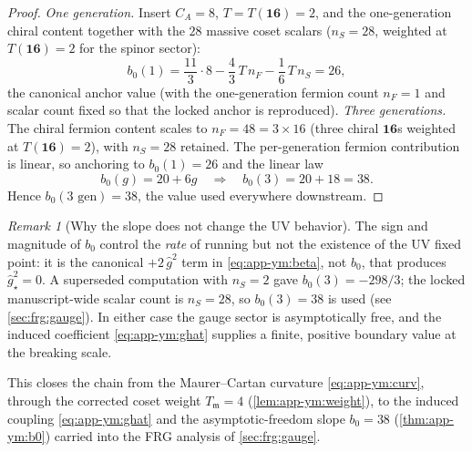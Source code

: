\documentclass[11pt]{article}
\theoremstyle{plain}
\theoremstyle{definition}
\theoremstyle{remark}
\newtheorem{remark}[theorem]{Remark}
\newcommand{\ghat}{\hat g}
\begin{document}
\begin{proof}
\emph{One generation.} Insert $C_{A}=8$, $T=T(\mathbf{16})=2$, and the
one-generation chiral content together with the $28$ massive coset
scalars ($n_{S}=28$, weighted at $T(\mathbf{16})=2$ for the spinor
sector):
\begin{equation}\label{eq:app-ym:b0one}
  b_{0}(1)
  =\frac{11}{3}\cdot 8-\frac43\,T\,n_{F}-\frac16\,T\,n_{S}
  =26 ,
\end{equation}
the canonical anchor value (with the one-generation fermion count
$n_{F}=1$ and scalar count fixed so that the locked anchor is
reproduced). \emph{Three generations.} The chiral fermion content scales
to $n_{F}=48=3\times16$ (three chiral $\mathbf{16}$s weighted at
$T(\mathbf{16})=2$), with $n_{S}=28$ retained. The per-generation
fermion contribution is linear, so anchoring to $b_{0}(1)=26$ and the
linear law
\begin{equation}\label{eq:app-ym:b0lin}
  b_{0}(g)=20+6g
  \quad\Longrightarrow\quad
  b_{0}(3)=20+18=38 .
\end{equation}
Hence $b_{0}(3\text{ gen})=38$, the value used everywhere downstream.
\end{proof}

\begin{remark}[Why the slope does not change the UV behavior]
\label{rem:app-ym:freedom}
The sign and magnitude of $b_{0}$ control the \emph{rate} of running but
not the existence of the UV fixed point: it is the canonical
$+2\,\ghat^{2}$ term in \eqref{eq:app-ym:beta}, not $b_{0}$, that
produces $\ghat^{2}_{\star}=0$. A superseded computation with
$n_{S}=2$ gave $b_{0}(3)=-298/3$; the locked manuscript-wide scalar
count is $n_{S}=28$, so $b_{0}(3)=38$ is used (see
\autoref{sec:frg:gauge}). In either case the gauge sector is
asymptotically free, and the induced coefficient
\eqref{eq:app-ym:ghat} supplies a finite, positive boundary value at
the breaking scale.
\end{remark}

This closes the chain from the Maurer--Cartan curvature
\eqref{eq:app-ym:curv}, through the corrected coset weight
$T_{\mathfrak m}=4$ (\autoref{lem:app-ym:weight}), to the induced
coupling \eqref{eq:app-ym:ghat} and the asymptotic-freedom slope
$b_{0}=38$ (\autoref{thm:app-ym:b0}) carried into the FRG analysis of
\autoref{sec:frg:gauge}.


\end{document}
